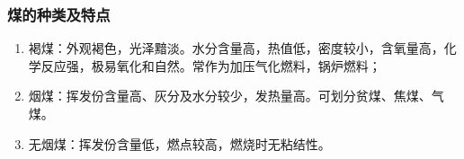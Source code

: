 \subsubsection{煤的种类及特点}
\begin{enumerate}
    \item 褐煤：外观褐色，光泽黯淡。水分含量高，热值低，密度较小，含氧量高，化学反应强，极易氧化和自然。常作为加压气化燃料，锅炉燃料；
    \item 烟煤：挥发份含量高、灰分及水分较少，发热量高。可划分贫煤、焦煤、气煤。
    \item 无烟煤：挥发份含量低，燃点较高，燃烧时无粘结性。
\end{enumerate}